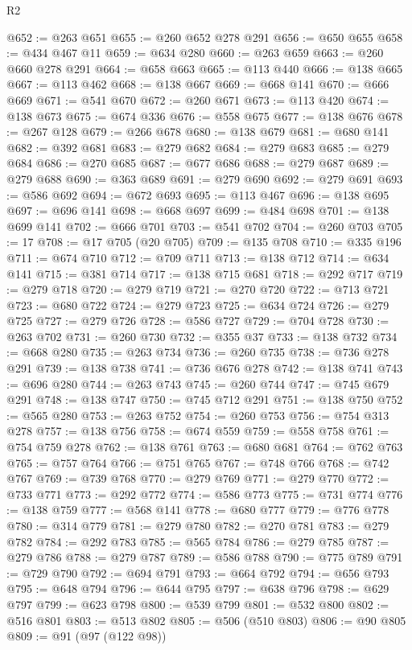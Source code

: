 \begin{lexlean}{R2}
\begin{coremodule}
@652 := @263 @651
@655 := @260 @652 @278 @291
@656 := @650 @655
@658 := @434 @467 @11
@659 := @634 @280
@660 := @263 @659
@663 := @260 @660 @278 @291
@664 := @658 @663
@665 := @113 @440
@666 := @138 @665
@667 := @113 @462
@668 := @138 @667
@669 := @668 @141
@670 := @666 @669
@671 := @541 @670
@672 := @260 @671
@673 := @113 @420
@674 := @138 @673
@675 := @674 @336
@676 := @558 @675
@677 := @138 @676
@678 := @267 @128
@679 := @266 @678
@680 := @138 @679
@681 := @680 @141
@682 := @392 @681
@683 := @279 @682
@684 := @279 @683
@685 := @279 @684
@686 := @270 @685
@687 := @677 @686
@688 := @279 @687
@689 := @279 @688
@690 := @363 @689
@691 := @279 @690
@692 := @279 @691
@693 := @586 @692
@694 := @672 @693
@695 := @113 @467
@696 := @138 @695
@697 := @696 @141
@698 := @668 @697
@699 := @484 @698
@701 := @138 @699 @141
@702 := @666 @701
@703 := @541 @702
@704 := @260 @703
@705 := 17
@708 := @17 @705 (@20 @705)
@709 := @135 @708
@710 := @335 @196
@711 := @674 @710
@712 := @709 @711
@713 := @138 @712
@714 := @634 @141
@715 := @381 @714
@717 := @138 @715 @681
@718 := @292 @717
@719 := @279 @718
@720 := @279 @719
@721 := @270 @720
@722 := @713 @721
@723 := @680 @722
@724 := @279 @723
@725 := @634 @724
@726 := @279 @725
@727 := @279 @726
@728 := @586 @727
@729 := @704 @728
@730 := @263 @702
@731 := @260 @730
@732 := @355 @37
@733 := @138 @732
@734 := @668 @280
@735 := @263 @734
@736 := @260 @735
@738 := @736 @278 @291
@739 := @138 @738
@741 := @736 @676 @278
@742 := @138 @741
@743 := @696 @280
@744 := @263 @743
@745 := @260 @744
@747 := @745 @679 @291
@748 := @138 @747
@750 := @745 @712 @291
@751 := @138 @750
@752 := @565 @280
@753 := @263 @752
@754 := @260 @753
@756 := @754 @313 @278
@757 := @138 @756
@758 := @674 @559
@759 := @558 @758
@761 := @754 @759 @278
@762 := @138 @761
@763 := @680 @681
@764 := @762 @763
@765 := @757 @764
@766 := @751 @765
@767 := @748 @766
@768 := @742 @767
@769 := @739 @768
@770 := @279 @769
@771 := @279 @770
@772 := @733 @771
@773 := @292 @772
@774 := @586 @773
@775 := @731 @774
@776 := @138 @759
@777 := @568 @141
@778 := @680 @777
@779 := @776 @778
@780 := @314 @779
@781 := @279 @780
@782 := @270 @781
@783 := @279 @782
@784 := @292 @783
@785 := @565 @784
@786 := @279 @785
@787 := @279 @786
@788 := @279 @787
@789 := @586 @788
@790 := @775 @789
@791 := @729 @790
@792 := @694 @791
@793 := @664 @792
@794 := @656 @793
@795 := @648 @794
@796 := @644 @795
@797 := @638 @796
@798 := @629 @797
@799 := @623 @798
@800 := @539 @799
@801 := @532 @800
@802 := @516 @801
@803 := @513 @802
@805 := @506 (@510 @803)
@806 := @90 @805
@809 := @91 (@97 (@122 @98))

\end{coremodule}
\end{lexlean}
